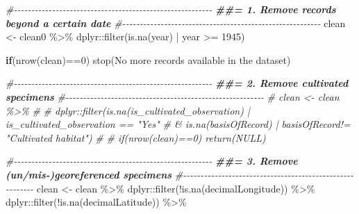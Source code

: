 \documentclass[
]{article}
\newenvironment{Shaded}{\begin{snugshade}}{\end{snugshade}}
\newcommand{\CommentTok}[1]{\textcolor[rgb]{0.56,0.35,0.01}{\textit{#1}}}
\newcommand{\ControlFlowTok}[1]{\textcolor[rgb]{0.13,0.29,0.53}{\textbf{#1}}}
\newcommand{\DecValTok}[1]{\textcolor[rgb]{0.00,0.00,0.81}{#1}}
\newcommand{\DocumentationTok}[1]{\textcolor[rgb]{0.56,0.35,0.01}{\textbf{\textit{#1}}}}
\newcommand{\FunctionTok}[1]{\textcolor[rgb]{0.00,0.00,0.00}{#1}}
\newcommand{\NormalTok}[1]{#1}
\newcommand{\OtherTok}[1]{\textcolor[rgb]{0.56,0.35,0.01}{#1}}
\newcommand{\SpecialCharTok}[1]{\textcolor[rgb]{0.00,0.00,0.00}{#1}}
\newcommand{\StringTok}[1]{\textcolor[rgb]{0.31,0.60,0.02}{#1}}
\begin{document}
\begin{Shaded}
\begin{Highlighting}[]

\CommentTok{\#{-}{-}{-}{-}{-}{-}{-}{-}{-}{-}{-}{-}{-}{-}{-}{-}{-}{-}{-}{-}{-}{-}{-}{-}{-}{-}{-}{-}{-}{-}{-}{-}{-}{-}{-}{-}{-}{-}{-}{-}{-}{-}{-}{-}{-}{-}{-}{-}{-}{-}{-}{-}{-}{-}{-}{-}{-}}
\DocumentationTok{\#\#= 1. Remove records beyond a certain date}
\CommentTok{\#{-}{-}{-}{-}{-}{-}{-}{-}{-}{-}{-}{-}{-}{-}{-}{-}{-}{-}{-}{-}{-}{-}{-}{-}{-}{-}{-}{-}{-}{-}{-}{-}{-}{-}{-}{-}{-}{-}{-}{-}{-}{-}{-}{-}{-}{-}{-}{-}{-}{-}{-}{-}{-}{-}{-}{-}{-}}
\NormalTok{clean }\OtherTok{\textless{}{-}}\NormalTok{ clean0 }\SpecialCharTok{\%\textgreater{}\%}
\NormalTok{  dplyr}\SpecialCharTok{::}\FunctionTok{filter}\NormalTok{(}\FunctionTok{is.na}\NormalTok{(year) }\SpecialCharTok{|}\NormalTok{ year }\SpecialCharTok{\textgreater{}=} \DecValTok{1945}\NormalTok{)}

\ControlFlowTok{if}\NormalTok{(}\FunctionTok{nrow}\NormalTok{(clean)}\SpecialCharTok{==}\DecValTok{0}\NormalTok{) }\FunctionTok{stop}\NormalTok{(}\StringTok{\textquotesingle{}No more records available in the dataset\textquotesingle{}}\NormalTok{)}

\CommentTok{\#{-}{-}{-}{-}{-}{-}{-}{-}{-}{-}{-}{-}{-}{-}{-}{-}{-}{-}{-}{-}{-}{-}{-}{-}{-}{-}{-}{-}{-}{-}{-}{-}{-}{-}{-}{-}{-}{-}{-}{-}{-}{-}{-}{-}{-}{-}{-}{-}{-}{-}{-}{-}{-}{-}{-}{-}{-}}
\DocumentationTok{\#\#= 2. Remove cultivated specimens}
\CommentTok{\#{-}{-}{-}{-}{-}{-}{-}{-}{-}{-}{-}{-}{-}{-}{-}{-}{-}{-}{-}{-}{-}{-}{-}{-}{-}{-}{-}{-}{-}{-}{-}{-}{-}{-}{-}{-}{-}{-}{-}{-}{-}{-}{-}{-}{-}{-}{-}{-}{-}{-}{-}{-}{-}{-}{-}{-}{-}}
\CommentTok{\# clean \textless{}{-} clean \%\textgreater{}\%}
\CommentTok{\#}
\CommentTok{\#   dplyr::filter(is.na(is\_cultivated\_observation) | is\_cultivated\_observation == "Yes"}
\CommentTok{\#                 \& is.na(basisOfRecord) | basisOfRecord!= "Cultivated habitat")}
\CommentTok{\#}
\CommentTok{\# if(nrow(clean)==0) return(NULL)}

\CommentTok{\#{-}{-}{-}{-}{-}{-}{-}{-}{-}{-}{-}{-}{-}{-}{-}{-}{-}{-}{-}{-}{-}{-}{-}{-}{-}{-}{-}{-}{-}{-}{-}{-}{-}{-}{-}{-}{-}{-}{-}{-}{-}{-}{-}{-}{-}{-}{-}{-}{-}{-}{-}{-}{-}{-}{-}{-}{-}}
\DocumentationTok{\#\#= 3. Remove (un/mis{-})georeferenced specimens}
\CommentTok{\#{-}{-}{-}{-}{-}{-}{-}{-}{-}{-}{-}{-}{-}{-}{-}{-}{-}{-}{-}{-}{-}{-}{-}{-}{-}{-}{-}{-}{-}{-}{-}{-}{-}{-}{-}{-}{-}{-}{-}{-}{-}{-}{-}{-}{-}{-}{-}{-}{-}{-}{-}{-}{-}{-}{-}{-}{-}}
\NormalTok{clean }\OtherTok{\textless{}{-}}\NormalTok{ clean }\SpecialCharTok{\%\textgreater{}\%}
\NormalTok{  dplyr}\SpecialCharTok{::}\FunctionTok{filter}\NormalTok{(}\SpecialCharTok{!}\FunctionTok{is.na}\NormalTok{(decimalLongitude)) }\SpecialCharTok{\%\textgreater{}\%}
\NormalTok{  dplyr}\SpecialCharTok{::}\FunctionTok{filter}\NormalTok{(}\SpecialCharTok{!}\FunctionTok{is.na}\NormalTok{(decimalLatitude)) }\SpecialCharTok{\%\textgreater{}\%}


\end{Highlighting}
\end{Shaded}
\end{document}
